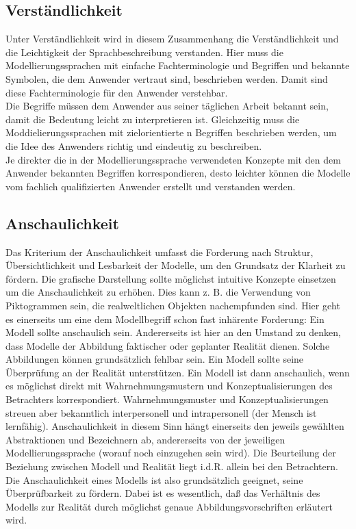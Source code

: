 \subsection{Verständlichkeit}
\label{sc:Verständlichkeit}
Unter Verständlichkeit wird in diesem Zusammenhang die Verständlichkeit und die Leichtigkeit der Sprachbeschreibung verstanden. Hier muss die Modellierungssprachen mit einfache Fachterminologie und Begriffen und bekannte Symbolen, die dem Anwender vertraut sind, beschrieben werden. Damit sind diese Fachterminologie für den Anwender verstehbar. \\
Die Begriffe müssen dem Anwender aus seiner täglichen Arbeit bekannt sein, damit die Bedeutung leicht zu interpretieren ist\cite{MT014}.
Gleichzeitig muss die Moddielierungssprachen mit zielorientierte n 
Begriffen beschrieben werden, um die Idee des Anwenders richtig und eindeutig zu beschreiben.\\
Je direkter die in der Modellierungssprache verwendeten
Konzepte mit den dem Anwender bekannten Begriffen
korrespondieren, desto leichter können die Modelle
vom fachlich qualifizierten Anwender erstellt
und verstanden werden\cite{MT006}.

\subsection{Anschaulichkeit}
\label{sc:Anschaulichkeit}
Das Kriterium der Anschaulichkeit umfasst die Forderung nach Struktur, Übersichtlichkeit und Lesbarkeit der Modelle, um den Grundsatz der Klarheit zu fördern. Die grafische Darstellung sollte möglichst intuitive Konzepte einsetzen um die Anschaulichkeit zu erhöhen. Dies kann z. B. die Verwendung von Piktogrammen sein, die realweltlichen Objekten nachempfunden sind\cite{Lobe_2015}.
Hier geht es einerseits um eine dem Modellbegriff schon fast inhärente Forderung: Ein Modell sollte
anschaulich sein. Andererseits ist hier an den Umstand zu denken, dass Modelle der Abbildung faktischer
oder geplanter Realität dienen. Solche Abbildungen können grundsätzlich fehlbar sein. Ein
Modell sollte seine Überprüfung an der Realität unterstützen.
Ein Modell ist dann anschaulich, wenn es möglichst direkt mit Wahrnehmungsmustern und Konzeptualisierungen
des Betrachters korrespondiert. Wahrnehmungsmuster und Konzeptualisierungen
streuen aber bekanntlich interpersonell und intrapersonell (der Mensch ist lernfähig). Anschaulichkeit
in diesem Sinn hängt einerseits den jeweils gewählten Abstraktionen und Bezeichnern ab, andererseits
von der jeweiligen Modellierungssprache (worauf noch einzugehen sein wird). Die Beurteilung der
Beziehung zwischen Modell und Realität liegt i.d.R. allein bei den Betrachtern. Die Anschaulichkeit
eines Modells ist also grundsätzlich geeignet, seine Überprüfbarkeit zu fördern. Dabei ist es wesentlich,
daß das Verhältnis des Modells zur Realität durch möglichst genaue Abbildungsvorschriften
erläutert wird.\cite{MT010}

